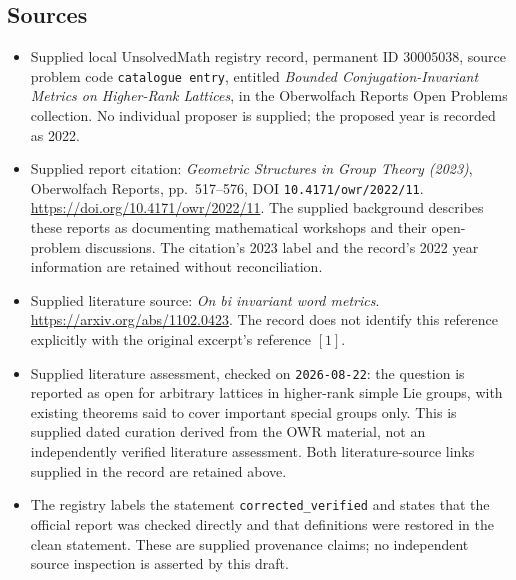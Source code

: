 \documentclass[11pt]{article}
\begin{document}
\subsection{Sources}
\begin{itemize}
\item Supplied local UnsolvedMath registry record, permanent ID \(30005038\), source problem code \texttt{catalogue entry}, entitled \emph{Bounded Conjugation-Invariant Metrics on Higher-Rank Lattices}, in the Oberwolfach Reports Open Problems collection. No individual proposer is supplied; the proposed year is recorded as 2022.
\item Supplied report citation: \emph{Geometric Structures in Group Theory (2023)}, Oberwolfach Reports, pp.\ 517--576, DOI \texttt{10.4171/owr/2022/11}. \url{https://doi.org/10.4171/owr/2022/11}. The supplied background describes these reports as documenting mathematical workshops and their open-problem discussions. The citation's 2023 label and the record's 2022 year information are retained without reconciliation.
\item Supplied literature source: \emph{On bi invariant word metrics}. \url{https://arxiv.org/abs/1102.0423}. The record does not identify this reference explicitly with the original excerpt's reference \([1]\).
\item Supplied literature assessment, checked on \texttt{2026-08-22}: the question is reported as open for arbitrary lattices in higher-rank simple Lie groups, with existing theorems said to cover important special groups only. This is supplied dated curation derived from the OWR material, not an independently verified literature assessment. Both literature-source links supplied in the record are retained above.
\item The registry labels the statement \texttt{corrected\_verified} and states that the official report was checked directly and that definitions were restored in the clean statement. These are supplied provenance claims; no independent source inspection is asserted by this draft.
\end{itemize}
\end{document}
